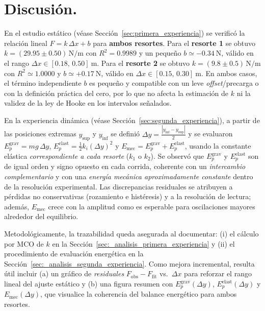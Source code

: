 \documentclass[11pt,twocolumn]{article}
\begin{document}

\section{Discusión.}

En el estudio estático (véase Sección~\ref{sec:primera_experiencia}) se verificó la relación lineal $F = k\,\Delta x + b$ para \textbf{ambos resortes}. 
Para el \textbf{resorte 1} se obtuvo $k=(29.95 \pm 0.50)\,\mathrm{N/m}$ con $R^2=0.9989$ y un pequeño $b\simeq -0.34~\mathrm{N}$, válido en el rango 
$\Delta x \in [0.18,\,0.50]~\mathrm{m}$. 
Para el \textbf{resorte 2} se obtuvo $k=(9.8 \pm 0.5)\,\mathrm{N/m}$ con $R^2\simeq 1.0000$ y $b\simeq +0.17~\mathrm{N}$, válido en 
$\Delta x \in [0.15,\,0.30]~\mathrm{m}$. 
En ambos casos, el término independiente $b$ es pequeño y compatible con un leve \emph{offset}/precarga o con la definición práctica del cero, por lo que no afecta la estimación de $k$ ni la validez de la ley de Hooke en los intervalos señalados.

En la experiencia dinámica (véase Sección~\ref{sec:segunda_experiencia}), a partir de las posiciones extremas $y_{\text{sup}}$ y $y_{\text{inf}}$ se definió 
$\Delta y=\tfrac{|y_{\text{inf}}-y_{\text{sup}}|}{2}$ y se evaluaron 
$E_p^{\text{grav}}=mg\,\Delta y$, 
$E_p^{\text{elast}}=\tfrac{1}{2}k_i(\Delta y)^2$ y 
$E_{\text{mec}}=E_p^{\text{grav}}+E_p^{\text{elast}}$, 
usando la constante elástica \emph{correspondiente a cada resorte} ($k_1$ o $k_2$). 
Se observó que $E_p^{\text{grav}}$ y $E_p^{\text{elast}}$ son de igual orden y signo opuesto en cada corrida, coherente con un \emph{intercambio complementario} y con una \emph{energía mecánica aproximadamente constante} dentro de la resolución experimental. 
Las discrepancias residuales se atribuyen a pérdidas no conservativas (rozamiento e histéresis) y a la resolución de lectura; además, $E_{\text{mec}}$ crece con la amplitud como es esperable para oscilaciones mayores alrededor del equilibrio.

Metodológicamente, la trazabilidad queda asegurada al documentar: (i) el cálculo por MCO de $k$ en la 
Sección~\ref{sec:_analisis_primera_experiencia} y (ii) el procedimiento de evaluación energética en la 
Sección~\ref{sec:_analisis_segunda_experiencia}. 
Como mejora incremental, resulta útil incluir (a) un gráfico de \emph{residuales} $F_{\text{obs}}-F_{\text{fit}}$ vs.\ $\Delta x$ para reforzar el rango lineal del ajuste estático y (b) una figura resumen con $E_p^{\text{grav}}(\Delta y)$, $E_p^{\text{elast}}(\Delta y)$ y $E_{\text{mec}}(\Delta y)$, que visualice la coherencia del balance energético para ambos resortes.
\end{document}
